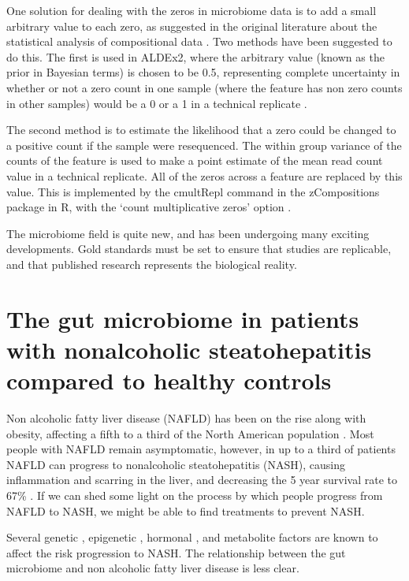 One solution for dealing with the zeros in microbiome data is to add a small arbitrary value to each zero, as suggested in the original literature about the statistical analysis of compositional data \cite{aitchison1982statistical}. Two methods have been suggested to do this. The first is used in ALDEx2, where the arbitrary value (known as the prior in Bayesian terms) is chosen to be 0.5, representing complete uncertainty in whether or not a zero count in one sample (where the feature has non zero counts in other samples) would be a 0 or a 1 in a technical replicate \cite{fernandes2013anova}.

The second method is to estimate the likelihood that a zero could be changed to a positive count if the sample were resequenced. The within group variance of the counts of the feature is used to make a point estimate of the mean read count value in a technical replicate. All of the zeros across a feature are replaced by this value. This is implemented by the cmultRepl command in the zCompositions package in R, with the `count multiplicative zeros' option \cite{palarea2015zcompositions}.

The microbiome field is quite new, and has been undergoing many exciting developments. Gold standards must be set to ensure that studies are replicable, and that published research represents the biological reality.

\section{The gut microbiome in patients with nonalcoholic steatohepatitis compared to healthy controls}

Non alcoholic fatty liver disease (NAFLD) has been on the rise along with obesity, affecting a fifth to a third of the North American population \cite{preiss2008non}. Most people with NAFLD remain asymptomatic, however, in up to a third of patients NAFLD can progress to nonalcoholic steatohepatitis (NASH), causing inflammation and scarring in the liver, and decreasing the 5 year survival rate to 67\% \cite{propst1995prognosis}. If we can shed some light on the process by which people progress from NAFLD to NASH, we might be able to find treatments to prevent NASH.

Several genetic \cite{sookoian2011meta} \cite{rivera2007toll}, epigenetic \cite{murphy2013relationship}, hormonal \cite{yasuda1999suppressive}, and metabolite \cite{raman2013fecal} factors are known to affect the risk progression to NASH. The relationship between the gut microbiome and non alcoholic fatty liver disease is less clear.

